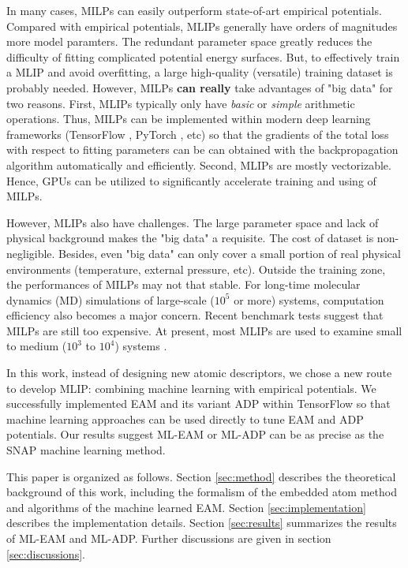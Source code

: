 \documentclass[final,3p,times]{elsarticle}
\begin{document}
In many cases, MILPs can easily outperform state-of-art empirical potentials. 
Compared with empirical potentials, MLIPs generally have orders of magnitudes 
more model paramters. The redundant parameter space greatly reduces the 
difficulty of fitting complicated potential energy surfaces. But, to effectively 
train a MLIP and avoid overfitting, a large high-quality (versatile) training 
dataset is probably needed. However, MILPs \textbf{can really} take advantages 
of "big data" for two reasons. First, MLIPs typically only have 
\textit{basic} or \textit{simple} arithmetic operations. Thus, MILPs can be 
implemented within modern deep learning frameworks 
(TensorFlow \cite{tensorflow}, PyTorch \cite{pytorch}, etc) 
so that the gradients of the total loss with respect to fitting parameters can 
be can obtained with the backpropagation algorithm automatically and 
efficiently. Second, MLIPs are mostly vectorizable. Hence, GPUs can be utilized
to significantly accelerate training and using of MILPs.

However, MLIPs also have challenges. The large parameter space and lack of 
physical background makes the "big data" a requisite. The cost of dataset is 
non-negligible. Besides, even "big data" can only cover a small portion of real 
physical environments (temperature, external pressure, etc). Outside the 
training zone, the performances of MILPs may not that stable. For long-time 
molecular dynamics (MD) simulations of large-scale ($10^5$ or more) systems, 
computation efficiency also becomes a major concern. Recent benchmark 
tests \cite{SnapBenchmark} suggest that MILPs are still too expensive. 
At present, most MLIPs are used to examine small to medium ($10^3$ to $10^4$) 
systems \cite{SNAP,SFApp0,SFApp1,SFApp2,soap3}.

In this work, instead of designing new atomic descriptors, we chose a new route 
to develop MLIP: combining machine learning with empirical potentials. We 
successfully implemented EAM and its variant ADP within TensorFlow so that 
machine learning approaches can be used directly to tune EAM and ADP potentials. 
Our results suggest ML-EAM or ML-ADP can be as precise as the SNAP machine 
learning method. 

This paper is organized as follows. Section \ref{sec:method} describes the 
theoretical background of this work, including the formalism of the embedded 
atom method and algorithms of the machine learned EAM. 
Section \ref{sec:implementation} describes the implementation details.
Section \ref{sec:results} summarizes the results of ML-EAM and ML-ADP. 
Further discussions are given in section \ref{sec:discussions}.
\end{document}
